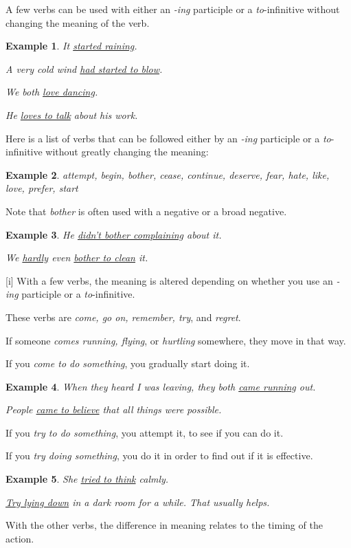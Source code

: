 \documentclass[oneside]{book}
\numberwithin{equation}{section}
\newtheorem{example}{Example}[section]
\begin{document}
%
\noindent{} A few verbs can be used with either an \textit{-ing} participle or a \textit{to}-infinitive without changing the meaning of the verb.
\begin{example}
    It \underline{started raining}.
    
    A very cold wind \underline{had started to blow}.
    
    We both \underline{love dancing}.
    
    He \underline{loves to talk} about his work.
\end{example}
Here is a list of verbs that can be followed either by an \textit{-ing} participle or a \textit{to}-infinitive without greatly changing the meaning:
\begin{example}
    attempt, begin, bother, cease, continue, deserve, fear, hate, like, love, prefer, start
\end{example}
Note that \textit{bother} is often used with a negative or a broad negative.
\begin{example}
    He \underline{didn't bother complaining} about it.
    
    We \underline{hardly} even \underline{bother to clean} it.
\end{example}
%
\noindent{} [i] With a few verbs, the meaning is altered depending on whether you use an \textit{-ing} participle or a \textit{to}-infinitive.

These verbs are \textit{come, go on, remember, try}, and \textit{regret}.

%
If someone \textit{comes running, flying}, or \textit{hurtling} somewhere, they move in that way.

If you \textit{come to do something}, you gradually start doing it.
\begin{example}
    When they heard I was leaving, they both \underline{came running} out.
    
    People \underline{came to believe} that all things were possible.
\end{example}
If you \textit{try to do something}, you attempt it, to see if you can do it.

If you \textit{try doing something}, you do it in order to find out if it is effective.
\begin{example}
    She \underline{tried to think} calmly.
    
    \underline{Try lying down} in a dark room for a while. That usually helps.
\end{example}
With the other verbs, the difference in meaning relates to the timing of the action.
\end{document}
